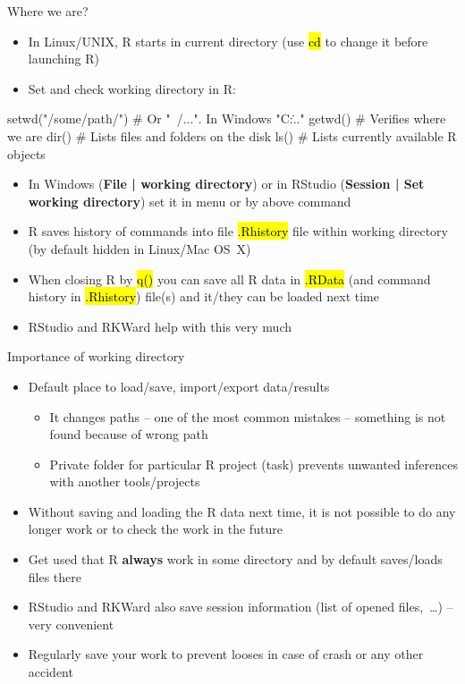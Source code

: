 \documentclass[compress, ucs, xelatex, 11pt, xcolor=svgnames,
  hyperref={
    bookmarks=true,
    unicode=true,
    colorlinks=true,
    pdftitle={Molecular data in R},
    plainpages=false,
    pdfauthor={Vojtech Zeisek},
    pdfsubject={Course about phylogeny and evolution in R},
    pdfcreator={XeLaTeX},
    pdfkeywords={R, evolution, phylogeny, molecular data},
    linkcolor=Tomato,
    anchorcolor=SaddleBrown,
    citecolor=Goldenrod,
    filecolor=DarkMagenta,
    menucolor=Sienna,
    urlcolor=DarkTurquoise,
    pdftex},
  url={hyphens, lowtilde} %
  ]{beamer}
\renewcommand{\texttt}[1]{\hl{\ttfamily #1}}
\begin{document}
\begin{frame}[fragile]{Where we are?}
  \begin{itemize}
    \item In Linux/UNIX, R starts in current directory (use \texttt{cd} to change it before launching R)
    \item \alert{Set and check working directory} in R:
  \end{itemize}
  \begin{spluscode}
    setwd("/some/path/") # Or "~/...". In Windows "C:\..."
    getwd() # Verifies where we are
    dir() # Lists files and folders on the disk
    ls() # Lists currently available R objects
  \end{spluscode}
  \begin{itemize}
    \item In Windows (\textbf{File | working directory}) or in RStudio (\textbf{Session | Set working directory}) set it in menu or by above command
    \item R saves history of commands into file \texttt{.Rhistory} file within working directory (by default hidden in Linux/Mac OS~X)
    \item When closing R by \texttt{q()} you can save all R data in \texttt{.RData} (and command history in \texttt{.Rhistory}) file(s) and it/they can be loaded next time
    \item RStudio and RKWard help with this very much
  \end{itemize}
\end{frame}

\begin{frame}{Importance of working directory}
  \begin{itemize}
    \item Default place to load/save, import/export data/results
    \begin{itemize}
      \item It changes paths -- one of the most common mistakes -- something is not found because of wrong path
      \item Private folder for particular R project (task) prevents unwanted inferences with another tools/projects
    \end{itemize}
    \item Without saving and loading the R data next time, it is not possible to do any longer work or to check the work in the future
    \item \alert{Get used that R \textbf{always} work in some directory and by default saves/loads files there}
    \item RStudio and RKWard also save session information (list of opened files,~\ldots) -- very convenient
    \item Regularly save your work to prevent looses in case of crash or any other accident
  \end{itemize}
\end{frame}
\end{document}
